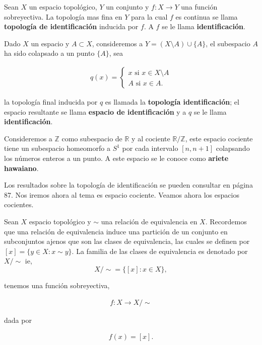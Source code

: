 \begin{df}
Sean $X$ un espacio topológico, $Y$ un conjunto y $f:X \to Y$ una función sobreyectiva. La topología mas fina en $Y$ para la cual $f$ es continua se llama \textbf{topología de identificación} inducida por $f$. A $f$ se le llama \textbf{identificación}.
\end{df}

Dado $X$ un espacio y $A \subset X$, consideremos a $Y=(X\setminus A) \cup \{A\}$, el subespacio $A$ ha sido colapsado a un punto $\{A\}$, sea

\begin{align*}
q(x)= \begin{cases}
x \text{ si } x \in X\setminus A \\
A \text{ si } x \in A.
\end{cases}
\end{align*}

la topología final inducida por $q$ es llamada la \textbf{topología identificación}; el espacio resultante se llama \textbf{espacio de identificación} y a $q$ se le llama \textbf{identificación}. 

\begin{ej}
Consideremos a $\mathbb{Z}$ como subespacio de $\mathbb{R}$ y al cociente $\mathbb{R}/\mathbb{Z}$, este espacio cociente tiene un subespacio homeomorfo a $S^1$ por cada intervalo $[n,n+1]$ colapsando los números enteros a un punto. A este espacio se le conoce como \textbf{ariete hawaiano}.
\end{ej}

Los resultados sobre la topología de identificación se pueden consultar en \cite{top_prieto} página 87. Nos iremos ahora al tema es espacio cociente. Veamos ahora los espacios cocientes.

Sean $X$ espacio topológico y $\sim$ una relación de equivalencia en $X$. Recordemos que una relación de equivalencia induce una partición de un conjunto en subconjuntos ajenos que son las clases de equivalencia, las cuales se definen por $[x]=\{y \in X : x \sim y\}$. La familia de las clases de equivalencia es denotado por $X/ \sim$ ie, $$X/ \sim=\{[x]: x \in X\},$$  

tenemos una función sobreyectiva,

\begin{align*}
f:X \to X / \sim
\end{align*}

dada por

\begin{align*}
f(x)=[x].
\end{align*}

